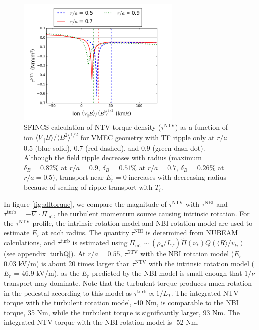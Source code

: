 \documentclass[aip, pop, preprint]{revtex4-1}
\numberwithin{figure}{section}
\numberwithin{equation}{section}
\begin{document}
\begin{figure}[h!]
\centering
\includegraphics[width=0.7\textwidth]
{Torque_radiusscaling.png}
\caption{\label{fig:Torque_radiusscaling} SFINCS calculation of NTV torque density ($\tau^{\text{NTV}}$) as a function of ion $\langle V_{||} B \rangle/\langle B^2 \rangle^{1/2}$ for VMEC geometry with TF ripple only at $r/a$ = 0.5 (blue solid), 0.7 (red dashed), and 0.9 (green dash-dot). Although the field ripple decreases with radius (maximum $\delta_B = 0.82\%$ at $r/a = 0.9$, $\delta_B = 0.51\%$ at $r/a = 0.7$, $\delta_B = 0.26\%$ at $r/a = 0.5$), transport near $E_r = 0$ increases with decreasing radius because of scaling of ripple transport with $T_i$.\cite{Shaing2003}}
\end{figure}

In figure \ref{fig:alltorque}, we compare the magnitude of $\tau^{\text{NTV}}$ with $\tau^{\text{NBI}}$ and $\tau^{\text{turb}} = -\nabla \cdot \Pi_{\text{int}}$, the turbulent momentum source causing intrinsic rotation. For the $\tau^{\text{NTV}}$ profile, the intrinsic rotation model and NBI rotation model are used to estimate $E_r$ at each radius. The quantity $\tau^{\text{NBI}}$ is determined from NUBEAM calculations,\cite{Poli2014} and $\tau^{\text{turb}}$ is estimated using $\Pi_{\text{int}} \sim (\rho_{\theta}/L_T) \widetilde{\Pi}(\nu_*) Q (\langle R \rangle/v_{ti})$ (see appendix \ref{turbQ}). At $r/a = 0.55$, $\tau^{\text{NTV}}$ with the NBI rotation model ($E_r$ = 0.03 kV/m) is about 20 times larger than $\tau^{\text{NTV}}$ with the intrinsic rotation model ($E_r$ = 46.9 kV/m), as the $E_r$ predicted by the NBI model is small enough that $1/\nu$ transport may dominate. Note that the turbulent torque produces much rotation in the pedestal according to this model as $\tau^{\text{turb}} \propto 1/L_T$. The integrated NTV torque with the turbulent rotation model, -40 Nm, is comparable to the NBI torque, 35 Nm, while the turbulent torque is significantly larger, 93 Nm. The integrated NTV torque with the NBI rotation model is -52 Nm.
\end{document}
